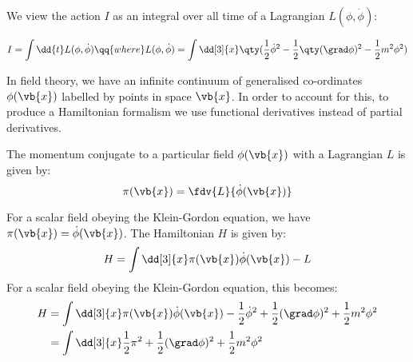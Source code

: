 \documentclass{jknotes} %
\begin{document}
We view the action \(I\) as an integral over all time of a Lagrangian \(L(\phi,\dot\phi)\):

\begin{equation}
    I = \int\dd{t} L(\phi,\dot\phi) \qq{where} L(\phi,\dot\phi) = \int\dd[3]{x}\qty(\frac{1}{2}\dot\phi^2 - \frac{1}{2}\qty(\grad\phi)^2-\frac{1}{2}m^2\phi^2)
\end{equation}

In field theory, we have an infinite continuum of generalised co-ordinates \(\phi(\vb{x})\) labelled by points in space \(\vb{x}\).  In order to account for this, to produce a Hamiltonian formalism we use functional derivatives instead of partial derivatives.

\begin{defn}
    The momentum conjugate to a particular field \(\phi(\vb{x})\) with a Lagrangian \(L\) is given by:
    \begin{equation}
        \pi(\vb{x}) = \fdv{L}{\dot\phi(\vb{x})}
    \end{equation}
\end{defn}

For a scalar field obeying the Klein-Gordon equation, we have \(\pi(\vb{x}) = \dot\phi(\vb{x})\). The Hamiltonian \(H\) is given by:
\begin{equation}
    H = \int\dd[3]{x} \pi(\vb{x})\dot\phi(\vb{x}) - L
\end{equation}
For a scalar field obeying the Klein-Gordon equation, this becomes:
\begin{align}
    H &= \int\dd[3]{x} \pi(\vb{x})\dot\phi(\vb{x}) - \frac{1}{2} \dot\phi^2 + \frac{1}{2} (\grad\phi)^2 + \frac{1}{2}m^2\phi^2 \\
    &= \int\dd[3]{x} \frac{1}{2}\pi^2 + \frac{1}{2}(\grad\phi)^2 + \frac{1}{2}m^2\phi^2
\end{align}
\end{document}
